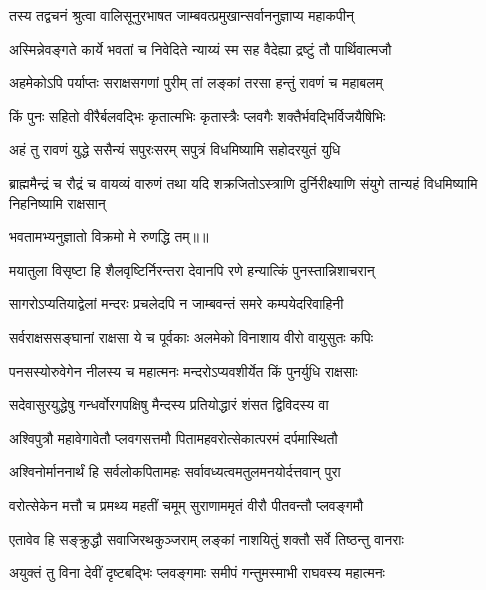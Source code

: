 
\twolineshloka
{तस्य तद्वचनं श्रुत्वा वालिसूनुरभाषत}
{जाम्बवत्प्रमुखान्सर्वाननुज्ञाप्य महाकपीन्} %

\twolineshloka
{अस्मिन्नेवङ्गते कार्ये भवतां च निवेदिते}
{न्याय्यं स्म सह वैदेह्या द्रष्टुं तौ पार्थिवात्मजौ} %

\twolineshloka
{अहमेकोऽपि पर्याप्तः सराक्षसगणां पुरीम्}
{तां लङ्कां तरसा हन्तुं रावणं च महाबलम्} %

\twolineshloka
{किं पुनः सहितो वीरैर्बलवद्भिः कृतात्मभिः}
{कृतास्त्रैः प्लवगैः शक्तैर्भवद्भिर्विजयैषिभिः} %

\twolineshloka
{अहं तु रावणं युद्धे ससैन्यं सपुरःसरम्}
{सपुत्रं विधमिष्यामि सहोदरयुतं युधि} %

\threelineshloka
{ब्राह्ममैन्द्रं च रौद्रं च वायव्यं वारुणं तथा}
{यदि शक्रजितोऽस्त्राणि दुर्निरीक्ष्याणि संयुगे}
{तान्यहं विधमिष्यामि निहनिष्यामि राक्षसान्} %

{भवतामभ्यनुज्ञातो विक्रमो मे रुणद्धि तम्॥॥} %

\addtocounter{shlokacount}{1}

\twolineshloka
{मयातुला विसृष्टा हि शैलवृष्टिर्निरन्तरा}
{देवानपि रणे हन्यात्किं पुनस्तान्निशाचरान्} %

\twolineshloka
{सागरोऽप्यतियाद्वेलां मन्दरः प्रचलेदपि}
{न जाम्बवन्तं समरे कम्पयेदरिवाहिनी} %

\twolineshloka
{सर्वराक्षससङ्घानां राक्षसा ये च पूर्वकाः}
{अलमेको विनाशाय वीरो वायुसुतः कपिः} %

\twolineshloka
{पनसस्योरुवेगेन नीलस्य च महात्मनः}
{मन्दरोऽप्यवशीर्येत किं पुनर्युधि राक्षसाः} %

\twolineshloka
{सदेवासुरयुद्धेषु गन्धर्वोरगपक्षिषु}
{मैन्दस्य प्रतियोद्धारं शंसत द्विविदस्य वा} %

\twolineshloka
{अश्विपुत्रौ महावेगावेतौ प्लवगसत्तमौ}
{पितामहवरोत्सेकात्परमं दर्पमास्थितौ} %

\twolineshloka
{अश्विनोर्माननार्थं हि सर्वलोकपितामहः}
{सर्वावध्यत्वमतुलमनयोर्दत्तवान् पुरा} %

\twolineshloka
{वरोत्सेकेन मत्तौ च प्रमथ्य महतीं चमूम्}
{सुराणाममृतं वीरौ पीतवन्तौ प्लवङ्गमौ} %

\twolineshloka
{एतावेव हि सङ्क्रुद्धौ सवाजिरथकुञ्जराम्}
{लङ्कां नाशयितुं शक्तौ सर्वे तिष्ठन्तु वानराः} %

\twolineshloka
{अयुक्तं तु विना देवीं दृष्टबद्भिः प्लवङ्गमाः}
{समीपं गन्तुमस्माभी राघवस्य महात्मनः} %

